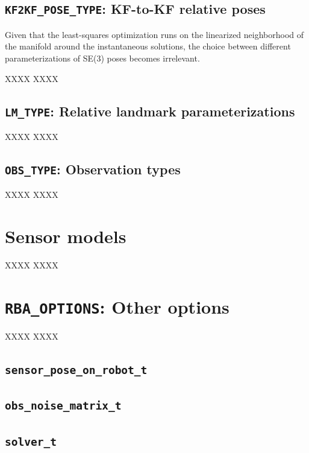 \documentclass[a4paper,11pt]{article}
\begin{document}
\subsection{\texttt{KF2KF\_POSE\_TYPE}: KF-to-KF relative poses}
\label{sec:k2k_types}

Given that the least-squares optimization runs on the linearized neighborhood of the manifold \cite{blanco2010tutorial} 
around the instantaneous solutions, the choice between different parameterizations of SE(3) poses becomes irrelevant. 

XXXX XXXX 

\subsection{\texttt{LM\_TYPE}: Relative landmark parameterizations}
\label{sec:k2f_types}

XXXX XXXX 

\subsection{\texttt{OBS\_TYPE}: Observation types}

XXXX XXXX 


\section{Sensor models}
\label{sect:program_sensors}

XXXX XXXX 


\section{\texttt{RBA\_OPTIONS}: Other options}
\label{sect:rba_options}

XXXX XXXX 


\subsection{\texttt{sensor\_pose\_on\_robot\_t}}


\subsection{\texttt{obs\_noise\_matrix\_t}}


\subsection{\texttt{solver\_t}}
\end{document}
